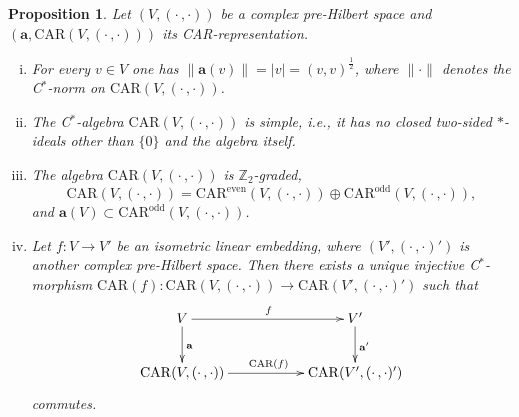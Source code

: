\documentclass[a4paper,11pt]{amsart}
\newtheorem{prop}[thm]{Proposition}
\theoremstyle{definition}
\begin{document}
\begin{prop}\label{pCAR}
Let $(V,(\cdot\,,\cdot))$ be a complex pre-Hilbert space and  $({\mathbf{a}},\mathrm{CAR}(V,(\cdot\,,\cdot)))$ its {\rm CAR}-representation.
\begin{enumerate}[(i)]
\item\label{pCAR:1}
For every $v\in V$ one has $\|{\mathbf{a}}(v)\|=|v|=(v,v)^{\frac{1}{2}}$, where $\|\cdot\|$ denotes the {\mbox{C$^*$}}-norm on $\mathrm{CAR}(V,(\cdot\,,\cdot))$.
\item \label{pCAR:2}
The {\mbox{C$^*$}}-algebra $\mathrm{CAR}(V,(\cdot\,,\cdot))$ is simple, i.e., it has no closed two-sided $*$-ideals other than $\{0\}$ and the algebra itself.
\item \label{pCAR:4}
The algebra $\mathrm{CAR}(V,(\cdot\,,\cdot))$ is ${\mathbb{Z}}_2$-graded, 
$$
\mathrm{CAR}(V,(\cdot\,,\cdot))=\mathrm{CAR}^\mathrm{even}(V,(\cdot\,,\cdot))\oplus\mathrm{CAR}^\mathrm{odd}(V,(\cdot\,,\cdot)),
$$ 
and ${\mathbf{a}}(V) \subset \mathrm{CAR}^\mathrm{odd}(V,(\cdot\,,\cdot))$.
\item \label{pCAR:3}
Let $f:V\to V'$ be an isometric linear embedding, where $(V',(\cdot\,,\cdot)')$ is another complex pre-Hilbert space.
Then there exists a unique injective {\mbox{C$^*$}}-morphism $\mathrm{CAR}(f):\mathrm{CAR}(V,(\cdot\,,\cdot))\to\mathrm{CAR}(V',(\cdot\,,\cdot)')$ such that 
$$
\xymatrix{
V\ar[rr]^{f}\ar[d]^{\mathbf{a}}
&&V' \ar[d]^{{\mathbf{a}}'}\\
\mathrm{CAR}(V,(\cdot\,,\cdot))\ar[rr]^{\mathrm{CAR}(f)}
&&\mathrm{CAR}(V',(\cdot\,,\cdot)')
}
$$
commutes.
\end{enumerate}
\end{prop}
\end{document}
